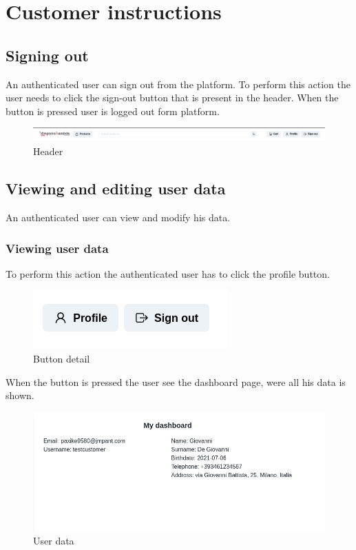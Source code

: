 \section{Customer instructions}
\subsection{Signing out}
An authenticated user can sign out from the platform. To perform this action the user needs to click the sign-out button that is present in the header. When the button is pressed user is logged out form platform.
\begin{figure}[!ht]
    \caption{Header}
    \vspace{10px}
    \includegraphics[scale=0.25]{../../../../Images/userManual/signOut.jpg}
    \centering
\end{figure}
\subsection{Viewing and editing user data}
An authenticated user can view and modify his data.
\subsubsection{Viewing user data}
To perform this action the authenticated user has to click the profile button.
\begin{figure}[!ht]
    \caption{Button detail}
    \vspace{10px}
    \includegraphics[scale=0.5]{../../../../Images/userManual/profile-signoutButton.png}
    \centering
\end{figure}
When the button is pressed the user see the dashboard page, were all his data is shown.
\begin{figure}[!ht]
    \caption{User data}
    \vspace{10px}
    \includegraphics[scale=0.5]{../../../../Images/userManual/profileDshboard.png}
    \centering
\end{figure}
\newpage
